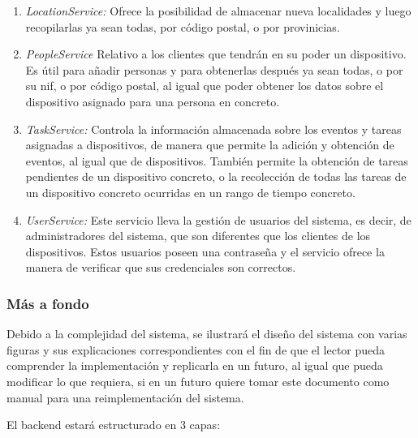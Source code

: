 \begin{enumerate}
            \item\textit{LocationService:}
            Ofrece la posibilidad de almacenar nueva localidades y luego recopilarlas ya sean todas, por código postal, o por provinicias.
            
            \item\textit{PeopleService}
            Relativo a los clientes que tendrán en su poder un dispositivo. Es útil para añadir personas y para obtenerlas después ya sean todas, o por su nif, o por código postal, al igual que poder obtener los datos sobre el dispositivo asignado para una persona en concreto.
            
            \item\textit{TaskService:} Controla la información almacenada sobre los eventos y tareas asignadas a dispositivos, de manera que permite la adición y obtención de eventos, al igual que de dispositivos. También permite la obtención de tareas pendientes de un dispositivo concreto, o la recolección de todas las tareas de un dispositivo concreto ocurridas en un rango de tiempo concreto.
            
            \item\textit{UserService:} Este servicio lleva la gestión de usuarios del sistema, es decir, de administradores del sistema, que son diferentes que los clientes de los dispositivos. Estos usuarios poseen una contraseña y el servicio ofrece la manera de verificar que sus credenciales son correctos.
            
        \end{enumerate}
    
    \subsubsection{Más a fondo}
    
    Debido a la complejidad del sistema, se ilustrará el diseño del sistema con varias figuras y sus explicaciones correspondientes con el fin de que el lector pueda comprender la implementación y replicarla en un futuro, al igual que pueda modificar lo que requiera, si en un futuro quiere tomar este documento como manual para una reimplementación del sistema.
    
    El backend estará estructurado en 3 capas:
    
